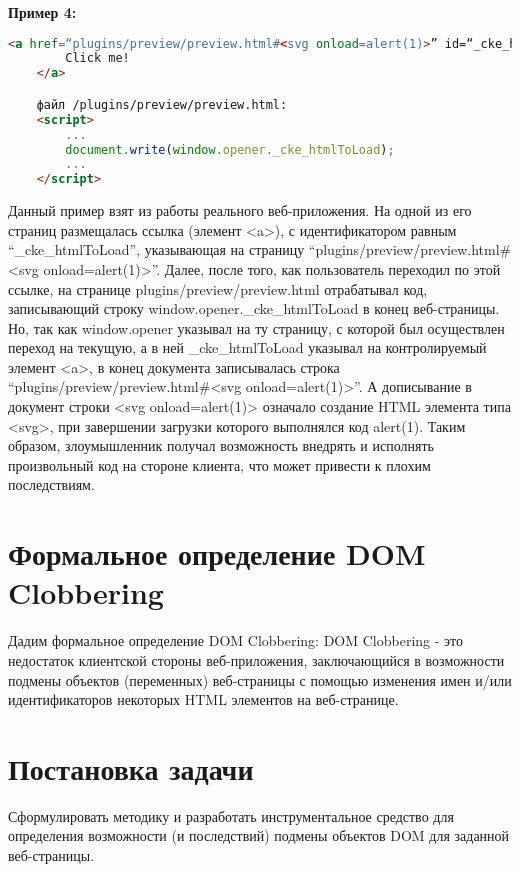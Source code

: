 \bigskip
\textbf{Пример 4:}

\begin{lstlisting}[language=HTML]
	<a href=“plugins/preview/preview.html#<svg onload=alert(1)>” id=“_cke_htmlToLoad” target=“_blank”>
		Click me!
	</a>

	файл /plugins/preview/preview.html:
	<script>
		...
		document.write(window.opener._cke_htmlToLoad);
		...
	</script>
\end{lstlisting}
\bigskip


Данный пример взят из работы реального веб-приложения. На одной из его страниц размещалась ссылка (элемент <a>), с идентификатором равным \\
“\_cke\_htmlToLoad”, указывающая на страницу “plugins/preview/preview.html\#<svg onload=alert(1)>”. Далее, после того, как пользователь переходил по этой ссылке, на странице plugins/preview/preview.html отрабатывал код, записывающий строку window.opener.\_cke\_htmlToLoad в конец веб-страницы. Но, так как window.opener указывал на ту страницу, с которой был осуществлен переход на текущую, а в ней \_cke\_htmlToLoad указывал на контролируемый элемент <a>, в конец документа записывалась строка “plugins/preview/preview.html\#<svg onload=alert(1)>”. А дописывание в документ строки <svg onload=alert(1)> означало создание HTML элемента типа <svg>, при завершении загрузки которого выполнялся код alert(1).
Таким образом, злоумышленник получал возможность внедрять и исполнять произвольный код на стороне клиента, что может привести к плохим последствиям.

\section{Формальное определение DOM Clobbering}

Дадим формальное определение DOM Clobbering: DOM Clobbering - это недостаток клиентской стороны веб-приложения, заключающийся в возможности подмены объектов (переменных) веб-страницы с помощью изменения имен и/или идентификаторов некоторых HTML элементов на веб-странице.

\section{Постановка задачи}
Сформулировать методику и разработать инструментальное средство для определения возможности (и последствий) подмены объектов DOM для заданной веб-страницы.